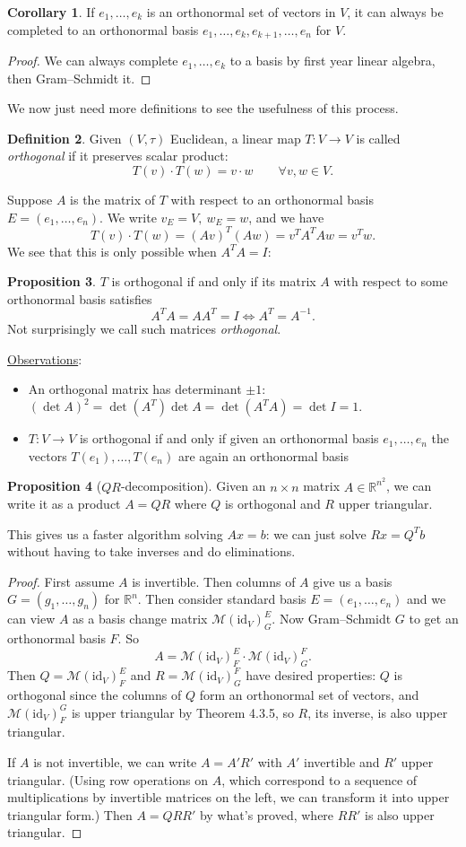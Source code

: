 \documentclass[a4paper]{article}
\theoremstyle{definition}
\newtheorem{defn}{Definition}[subsection]
\newtheorem{prop}[defn]{Proposition}
\newtheorem{coro}[defn]{Corollary}
\begin{document}
\begin{coro}
If $e_1,\ldots,e_k$ is an orthonormal set of vectors in $V$, it can always be completed to an orthonormal basis $e_1,\ldots,e_k,e_{k+1},\ldots,e_n$ for $V$.
\end{coro}
\begin{proof}
We can always complete $e_1,\ldots,e_k$ to a basis by first year linear algebra, then Gram--Schmidt it.
\end{proof}
We now just need more definitions to see the usefulness of this process.
\begin{defn}
Given $(V,\tau)$ Euclidean, a linear map $T:V\rightarrow V$ is called \textit{orthogonal} if it preserves scalar product:
\[
T(v)\cdot T(w) = v\cdot w \qquad \forall v,w\in V.
\]
\end{defn}
Suppose $A$ is the matrix of $T$ with respect to an orthonormal basis $E=(e_1,\ldots,e_n)$. We write $v_E=V,\ w_E=w$, and we have
\[
T(v)\cdot T(w) = (Av)^T (Aw) = v^TA^TAw = v^Tw.
\]
We see that this is only possible when $A^TA=I$:
\begin{prop}
$T$ is orthogonal if and only if its matrix $A$ with respect to some orthonormal basis satisfies
\[
A^TA=AA^T=I \Leftrightarrow A^T=A^{-1}.
\]
Not surprisingly we call such matrices \textit{orthogonal}.
\end{prop}
\underline{Observations}:
\begin{itemize}
    \item An orthogonal matrix has determinant $\pm 1$:
    $(\det A)^2=\det(A^T)\det A=\det (A^TA)=\det I=1 .$
    \item $T:V\rightarrow V$ is orthogonal if and only if given an orthonormal basis $e_1,\ldots,e_n$ the vectors $T(e_1),\ldots,T(e_n)$ are again an orthonormal basis
\end{itemize}
\begin{prop}[$QR$-decomposition]
Given an $n\times n$ matrix $A\in \mathbb R^{n^2}$, we can write it as a product $A=QR$ where $Q$ is orthogonal and $R$ upper triangular.
\end{prop}
This gives us a faster algorithm solving $Ax=b$: we can just solve $Rx=Q^Tb$ without having to take inverses and do eliminations.
\begin{proof}
First assume $A$ is invertible. Then columns of $A$ give us a basis $G=(g_1,\ldots,g_n)$ for $\mathbb R^n$. Then consider standard basis $E=(e_1,\ldots,e_n)$ and we can view $A$ as a basis change matrix $\mathcal M (\text{id}_V)_G^E$. Now Gram--Schmidt $G$ to get an orthonormal basis $F$. So
\[
A=\mathcal M (\text{id}_V)_F^E \cdot \mathcal M (\text{id}_V)_G^F .
\]
Then $Q=\mathcal M (\text{id}_V)_F^E$ and $R=\mathcal M (\text{id}_V)_G^F$ have desired properties: $Q$ is orthogonal since the columns of $Q$ form an orthonormal set of vectors, and $\mathcal M (\text{id}_V)_F^G$ is upper triangular by Theorem 4.3.5, so $R$, its inverse, is also upper triangular.

If $A$ is not invertible, we can write $A=A'R'$ with $A'$ invertible and $R'$ upper triangular. (Using row operations on $A$, which correspond to a sequence of multiplications by invertible matrices on the left, we can transform it into upper triangular form.) Then $A=QRR'$ by what's proved, where $RR'$ is also upper triangular.
\end{proof}
\end{document}
